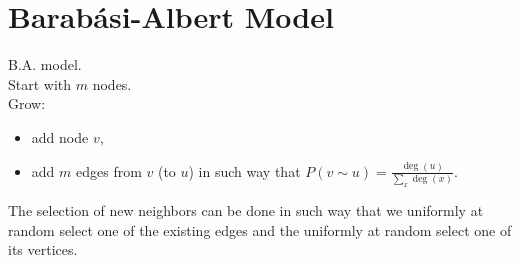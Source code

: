 \documentclass[a4paper, 12pt]{book}
\theoremstyle{definition}
\theoremstyle{remark}
\begin{document}
\section{Barabási-Albert Model}

B.A. model. \\
Start with $m$ nodes. \\
Grow:
\begin{itemize}
  \item add node $v$,
  \item add $m$ edges from $v$ (to $u$) in such way that $P(v \sim u) = \frac{\deg(u)}{\sum_x \deg(x)}$.
\end{itemize}

The selection of new neighbors can be done in such way that we uniformly at random select one of the existing edges and the uniformly at random select one of its vertices.
\end{document}
